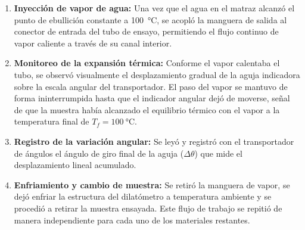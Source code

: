 \begin{enumerate}
    \item \textbf{Inyección de vapor de agua:} Una vez que el agua en el matraz alcanzó el punto de ebullición constante a \qty{100}{\celsius}, se acopló la manguera de salida al conector de entrada del tubo de ensayo, permitiendo el flujo continuo de vapor caliente a través de su canal interior.
    \item \textbf{Monitoreo de la expansión térmica:} Conforme el vapor calentaba el tubo, se observó visualmente el desplazamiento gradual de la aguja indicadora sobre la escala angular del transportador. El paso del vapor se mantuvo de forma ininterrumpida hasta que el indicador angular dejó de moverse, señal de que la muestra había alcanzado el equilibrio térmico con el vapor a la temperatura final de $T_f = \qty{100}{\celsius}$.
    \item \textbf{Registro de la variación angular:} Se leyó y registró con el transportador de ángulos el ángulo de giro final de la aguja ($\Delta\theta$) que mide el desplazamiento lineal acumulado.
    \item \textbf{Enfriamiento y cambio de muestra:} Se retiró la manguera de vapor, se dejó enfriar la estructura del dilatómetro a temperatura ambiente y se procedió a retirar la muestra ensayada. Este flujo de trabajo se repitió de manera independiente para cada uno de los materiales restantes.
\end{enumerate}